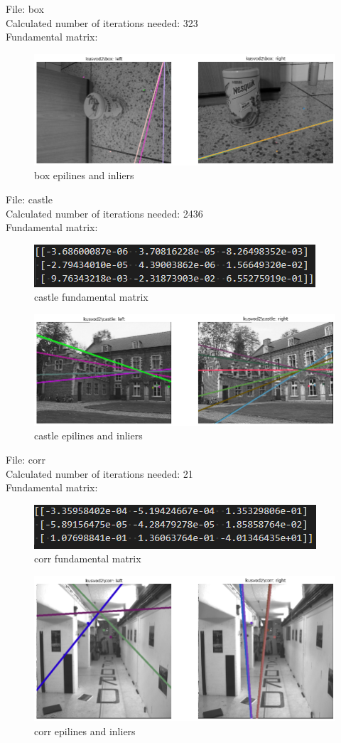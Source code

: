 \documentclass[10pt,a4paper]{article}
\begin{document}
File: box\\
Calculated number of iterations needed: 323\\
Fundamental matrix:
\begin{figure}[H]
	\centering
	\includegraphics[width=0.7\linewidth]{img/box}
	\caption{box epilines and inliers}
	\label{fig:box}
\end{figure}

File: castle\\
Calculated number of iterations needed: 2436\\
Fundamental matrix:
\begin{figure}[H]
	\centering
	\includegraphics[width=0.7\linewidth]{img/castlef}
	\caption{castle fundamental matrix}
	\label{fig:castlef}
\end{figure}
\begin{figure}[H]
	\centering
	\includegraphics[width=0.7\linewidth]{img/castle}
	\caption{castle epilines and inliers}
	\label{fig:castle}
\end{figure}

File: corr\\
Calculated number of iterations needed: 21\\
Fundamental matrix:
\begin{figure}[H]
	\centering
	\includegraphics[width=0.7\linewidth]{img/corrf}
	\caption{corr fundamental matrix}
	\label{fig:corrf}
\end{figure}
\begin{figure}[H]
	\centering
	\includegraphics[width=0.7\linewidth]{img/corr}
	\caption{corr epilines and inliers}
	\label{fig:corr}
\end{figure}
\end{document}
